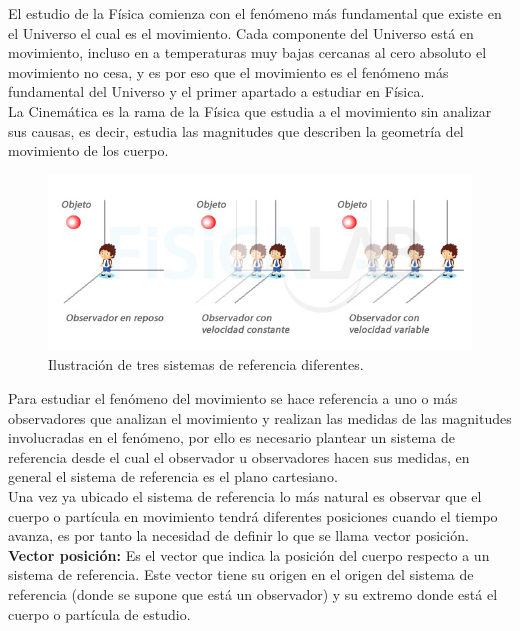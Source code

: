 \documentclass[a5paper,pagesize,10pt,bibtotoc,pointlessnumbers,
normalheadings,DIV=9,fleqn,x11names,table,twoside=false]{scrbook}
\begin{document}
El estudio de la Física comienza con el fenómeno más fundamental que existe en el Universo el cual es el movimiento. Cada 
componente del Universo está en movimiento, incluso en a temperaturas muy bajas cercanas al cero absoluto el movimiento no cesa, y 
es por eso que el movimiento es el fenómeno más fundamental del Universo y el primer apartado a estudiar en Física.\\

La Cinemática es la rama de la Física que estudia a el movimiento sin analizar sus causas, es decir, estudia las magnitudes que 
describen la geometría del movimiento de los cuerpo.\\ 

\begin{figure}[ht]
 \centering
 \includegraphics[scale=0.37]{images/sistema_inercial_no_inercial.jpg}
 \caption{Ilustración de tres sistemas de referencia diferentes.}
\end{figure}

Para estudiar el fenómeno del movimiento se hace referencia a uno o más observadores que analizan el movimiento y realizan las 
medidas de las magnitudes involucradas en el fenómeno, por ello es necesario plantear un sistema de referencia desde el cual el 
observador u observadores hacen sus medidas, en general el sistema de referencia es el plano cartesiano.\\

Una vez ya ubicado el sistema de referencia lo más natural es observar que el cuerpo o partícula en movimiento tendrá diferentes 
posiciones cuando el tiempo avanza, es por tanto la necesidad de definir lo que se llama vector posición.\\ 

\textbf{Vector posición:} Es el vector que indica la posición del cuerpo respecto a un sistema de referencia. Este vector tiene 
su origen en el origen del sistema de referencia (donde se supone que está un observador) y su extremo donde está el cuerpo o 
partícula de estudio.
\end{document}
